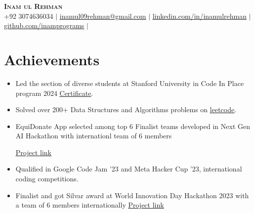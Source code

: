 \documentclass[letterpaper,11pt]{article}
\newcommand{\resumeItem}[1]{
  \item\small{
    {#1 \vspace{-2pt}}
  }
}
\newcommand{\resumeSubHeadingListStart}{\begin{itemize}[leftmargin=0.15in, label={}]}
\newcommand{\resumeSubHeadingListEnd}{\end{itemize}}
\newcommand{\resumeItemListStart}{\begin{itemize}}
\newcommand{\resumeItemListEnd}{\end{itemize}\vspace{-5pt}}
\begin{document}

\begin{center}
  \textbf{\Huge \scshape Inam ul Rehman } \\ \vspace{1pt}
  \small +92 3074636034 $|$
  \href{mailto:inamul09rehman@gmail.com}{\underline{inamul09rehman@gmail.com}} $|$
  \href{https://www.linkedin.com/in/inamulrehman/}{\underline{linkedin.com/in/inamulrehman}} $|$
  \href{https://github.com/inamprograms}{\underline{github.com/inamprograms}} $|$
\end{center}

\section{Achievements}
\resumeItemListStart
\resumeItem{Led the section of diverse students at Stanford University in Code In Place program 2024 {\href{https://leetcode.com/inamulrehman09/}{\underline{Certificate}}}.}
\resumeItem{Solved over 200+ Data Structures and Algorithms problems on {\href{https://leetcode.com/inamulrehman09/}{\underline{leetcode}}}.}
\resumeItem{EquiDonate App selected among top 6 Finalist teams developed in Next Gen AI Hackathon with internationl team of 6 members}
    {\href{https://github.com/inamprograms/Food-complaint-resolution-app}{\underline{Project link}}}
\resumeItem{Qualified in Google Code Jam '23 and Meta Hacker Cup '23, international coding competitions.}
\resumeItem{Finalist and got Silvar award at World Innovation Day Hackathon 2023 with a team of 6 members internationally
    {\href{https://github.com/inamprograms/EquiDonate}{\underline{Project link}}}}
\resumeItemListEnd
\end{document}
